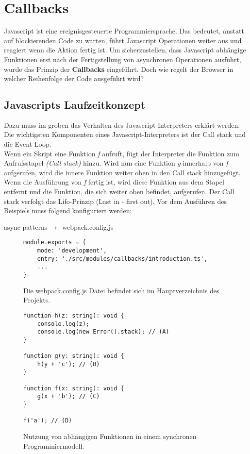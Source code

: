 \section{Callbacks}
Javascript ist eine ereignisgesteuerte Programmiersprache. Das bedeutet, anstatt auf blockierenden Code zu warten, führt Javascript Operationen weiter aus und reagiert wenn die Aktion fertig ist. Um sicherzustellen, dass Javascript abhängige Funktionen erst nach der Fertigstellung von asynchronen Operationen ausführt, wurde das Prinzip der \textbf{Callbacks} eingeführt. Doch wie regelt der Browser in welcher Reihenfolge der Code ausgeführt wird?

\subsection{Javascripts Laufzeitkonzept}
Dazu muss im groben das Verhalten des Javascript-Interpreters erklärt werden. Die wichtigsten Komponenten eines Javascript-Interpreters ist der Call stack und die Event Loop.\\

\noindent
Wenn ein Skript eine Funktion \textit{f} aufruft, fügt der Interpreter die Funktion zum Aufrufsstapel \textit{(Call stack)} hinzu. Wird nun eine Funktion \textit{g} innerhalb von \textit{f} aufgerufen, wird die innere Funktion weiter oben in den Call stack hinzugefügt. Wenn die Ausführung von \textit{f} fertig ist, wird diese Funktion aus dem Stapel entfernt und die Funktion, die sich weiter oben befindet, aufgerufen. Der Call stack verfolgt das Lifo-Prinzip (Last in - first out)\cite{javascript-interpreter}. Vor dem Ausführen des Beispiels muss folgend konfiguriert werden:

\begin{center}
    async-patterns$\,\to\,$ webpack.config.js
\end{center}

\begin{figure}[H]
\begin{lstlisting}[basicstyle=\small]
module.exports = {
    mode: 'development',
    entry: './src/modules/callbacks/introduction.ts',
    ...
}
\end{lstlisting}
\caption{Die webpack.config.js Datei befindet sich im Hauptverzeichnis des Projekts.}
\end{figure}

\begin{figure}[H]
\begin{lstlisting}[basicstyle=\small]
function h(z: string): void {
    console.log(z);
    console.log(new Error().stack); // (A)
}

function g(y: string): void {
    h(y + 'c'); // (B)
}

function f(x: string): void {
    g(x + 'b'); // (C)
}

f('a'); // (D)
\end{lstlisting}
\caption{Nutzung von abhängigen Funktionen in einem synchronen Programmiermodell.}
\end{figure}


